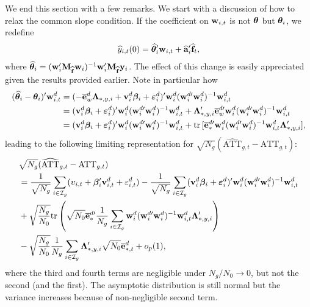 \documentclass[12pt,fleqn]{article}
\begin{document}
We end this section with a few remarks. We start with a discussion of how to relax the common slope condition. If the coefficient on $\mathbf{w}_{i,t}$ is not $\boldsymbol{\theta}$ but $\boldsymbol{\theta}_i$,
we redefine
\begin{align}
\widehat y_{i,t}(0) = \widehat{\boldsymbol{\theta}}_i'\mathbf{w}_{i,t} + \widehat{\mathbf{a}}_{i}'\widehat{\mathbf{f}}_{t},
\end{align}
where $\widehat{\boldsymbol{\theta}}_i = (\mathbf{w}_{i}'\mathbf{M}_{\widehat{\mathbf{f}}}\mathbf{w}_{i})^{-1}\mathbf{w}_{i}' \mathbf{M}_{\widehat{\mathbf{f}}}\mathbf{y}_{i}$. The effect of this change is easily appreciated given the results provided earlier. Note in particular how
\begin{align}
(\widehat{\boldsymbol{\theta}}_i - \boldsymbol{\theta}_i)'\mathbf{w}_{i,t}^{d} &=  (-\overline{\mathbf{e}}_{w}^d\boldsymbol{\Lambda}_{*,y,i}  + \mathbf{v}_i^d\boldsymbol{\beta}_i +  \boldsymbol{\varepsilon}_{i}^d)'\mathbf{w}_{i}^{d} (\mathbf{w}_{i}^{d\prime}\mathbf{w}_{i}^d)^{-1}\mathbf{w}_{i,t}^{d} \notag\\
&= ( \mathbf{v}_i^d\boldsymbol{\beta}_i +  \boldsymbol{\varepsilon}_{i}^d)'\mathbf{w}_{i}^{d} (\mathbf{w}_{i}^{d\prime}\mathbf{w}_{i}^d)^{-1}\mathbf{w}_{i,t}^{d}  + \boldsymbol{\Lambda}_{*,y,i}'\overline{\mathbf{e}}_{w}^{d\prime}\mathbf{w}_{i}^{d} (\mathbf{w}_{i}^{d\prime}\mathbf{w}_{i}^d)^{-1}\mathbf{w}_{i,t}^{d} \notag\\
&= ( \mathbf{v}_i^d\boldsymbol{\beta}_i +  \boldsymbol{\varepsilon}_{i}^d)'\mathbf{w}_{i}^{d} (\mathbf{w}_{i}^{d\prime}\mathbf{w}_{i}^d)^{-1}\mathbf{w}_{i,t}^{d}  + \mathrm{tr}\,[\overline{\mathbf{e}}_{*}^{d\prime}\mathbf{w}_{i}^{d} (\mathbf{w}_{i}^{d\prime}\mathbf{w}_{i}^d)^{-1}\mathbf{w}_{i,t}^{d} \boldsymbol{\Lambda}_{*,y,i}'],
\end{align}
leading to the following limiting representation for $\sqrt{N_g}(\widehat{\mathrm{ATT}}_{g,t} - \mathrm{ATT}_{g,t})$:
\begin{align}
& \sqrt{N_g}(\widehat{\mathrm{ATT}}_{g,t} - \mathrm{ATT}_{g,t}) \notag\\
&= \frac{1}{\sqrt{N_g}}\sum_{i\in \mathcal{I}_g}(\upsilon_{i,t}  + \boldsymbol{\beta}_i'\mathbf{v}_{i,t}^d + \varepsilon_{i,t}^d)  - \frac{1}{\sqrt{N_g}}\sum_{i\in \mathcal{I}_g} ( \mathbf{v}_i^d\boldsymbol{\beta}_i +  \boldsymbol{\varepsilon}_{i}^d)'\mathbf{w}_{i}^{d} (\mathbf{w}_{i}^{d\prime}\mathbf{w}_{i}^d)^{-1}\mathbf{w}_{i,t}^{d} \notag\\
& +  \sqrt{\frac{N_g}{N_0}} \mathrm{tr}\left(\sqrt{N_0}\overline{\mathbf{e}}_{*}^{d\prime}\frac{1}{N_g}\sum_{i\in \mathcal{I}_g}\mathbf{w}_{i}^{d} (\mathbf{w}_{i}^{d\prime}\mathbf{w}_{i}^d)^{-1}\mathbf{w}_{i,t}^{d} \boldsymbol{\Lambda}_{*,y,i}'\right) \notag\\
& - \sqrt{\frac{N_g}{N_0}} \frac{1}{N_g}\sum_{i\in \mathcal{I}_g} \boldsymbol{\Lambda}_{*,y,i}'\sqrt{N_0}\overline{\mathbf{e}}_{*,t}^{d} + o_p(1),
\end{align}
where the third and fourth terms are negligible under $N_g/N_0\to 0$, but not the second (and the first). The asymptotic distribution is still normal but the variance increases because of non-negligible second term.
\end{document}
